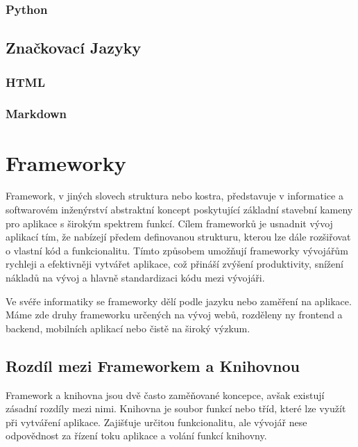 \subsubsection{Python}
\label{subsubsec:languages-interpreted-python}

\subsection{Značkovací Jazyky}
\label{subsec:languages-markup}

\subsubsection{HTML}
\label{subsubsec:languages-markup-html}

\subsubsection{Markdown}
\label{subsubsec:languages-markup-markdown}


\section{Frameworky}
\label{sec:dev-framework}
Framework, v jiných slovech struktura nebo kostra, představuje v informatice a softwarovém inženýrství abstraktní koncept poskytující základní stavební kameny pro aplikace s širokým spektrem funkcí. Cílem frameworků je usnadnit vývoj aplikací tím, že nabízejí předem definovanou strukturu, kterou lze dále rozšiřovat o vlastní kód a funkcionalitu. Tímto způsobem umožňují frameworky vývojářům rychleji a efektivněji vytvářet aplikace, což přináší zvýšení produktivity, snížení nákladů na vývoj a hlavně standardizaci kódu mezi vývojáři.

Ve svéře informatiky se frameworky dělí podle jazyku nebo zaměření na aplikace. Máme zde druhy frameworku určených na vývoj webů, rozděleny ny frontend a backend, mobilních aplikací nebo čistě na široký výzkum. \cite{about_framework}

\subsection*{Rozdíl mezi Frameworkem a Knihovnou}
Framework a knihovna jsou dvě často zaměňované koncepce, avšak existují zásadní rozdíly mezi nimi. Knihovna je soubor funkcí nebo tříd, které lze využít při vytváření aplikace. Zajišťuje určitou funkcionalitu, ale vývojář nese odpovědnost za řízení toku aplikace a volání funkcí knihovny.


